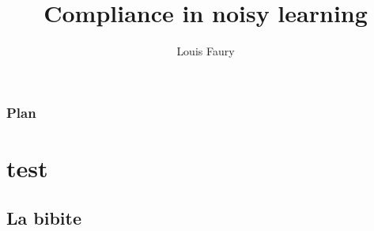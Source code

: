 \documentclass[t]{beamer}
\begin{document}
\title[Role of compliance in noisy learning imitation tradeoff]{Compliance in noisy learning}
\author[Test]{Louis Faury}
\titlegraphic{}

\titlepage

\begin{frame}[t]
	\vspace{-3ex}
	\frametitle{Plan}
  	\tableofcontents[hideothersubsections]
\end{frame}

\section{test}
\subsection{La bibite}
\frame[t]
{

}


%
\end{document}
